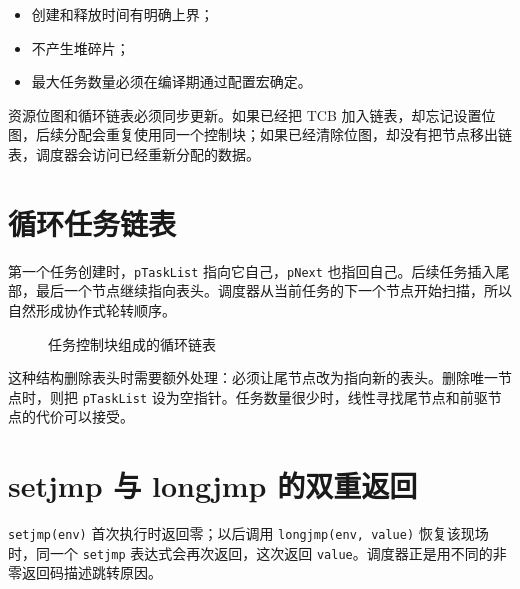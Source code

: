 \begin{itemize}
\item 创建和释放时间有明确上界；
\item 不产生堆碎片；
\item 最大任务数量必须在编译期通过配置宏确定。
\end{itemize}

资源位图和循环链表必须同步更新。如果已经把 TCB 加入链表，却忘记设置位图，后续分配会重复使用同一个控制块；如果已经清除位图，却没有把节点移出链表，调度器会访问已经重新分配的数据。

\section{循环任务链表}

第一个任务创建时，\texttt{pTaskList} 指向它自己，\texttt{pNext} 也指回自己。后续任务插入尾部，最后一个节点继续指向表头。调度器从当前任务的下一个节点开始扫描，所以自然形成协作式轮转顺序。

\begin{figure}[htbp]
\centering
{}
\caption{任务控制块组成的循环链表} \label{fig:app-coro-ring}
\end{figure}

这种结构删除表头时需要额外处理：必须让尾节点改为指向新的表头。删除唯一节点时，则把 \texttt{pTaskList} 设为空指针。任务数量很少时，线性寻找尾节点和前驱节点的代价可以接受。

\section{setjmp 与 longjmp 的双重返回}

\texttt{setjmp(env)} 首次执行时返回零；以后调用 \texttt{longjmp(env, value)} 恢复该现场时，同一个 \texttt{setjmp} 表达式会再次返回，这次返回 \texttt{value}。调度器正是用不同的非零返回码描述跳转原因。

